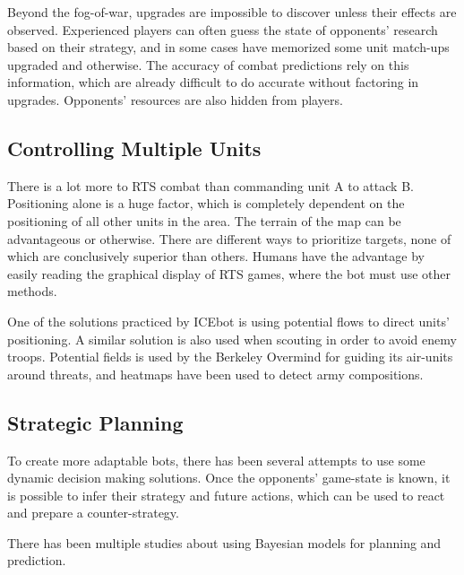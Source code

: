 	Beyond the fog-of-war, upgrades are impossible to discover unless their effects are observed. Experienced players can often guess the state of opponents' research based on their strategy, and in some cases have memorized some unit match-ups upgraded and otherwise. The accuracy of combat predictions rely on this information, which are already difficult to do accurate without factoring in upgrades. Opponents' resources are also hidden from players.
	
	
	
	\subsection*{Controlling Multiple Units}
	There is a lot more to RTS combat than commanding unit A to attack B. Positioning alone is a huge factor, which is completely dependent on the positioning of all other units in the area. The terrain of the map can be advantageous or otherwise. There are different ways to prioritize targets, none of which are conclusively superior than others. Humans have the advantage by easily reading the graphical display of RTS games, where the bot must use other methods.
	
	One of the solutions practiced by ICEbot is using potential flows to direct units' positioning. A similar solution is also used when scouting in order to avoid enemy troops. Potential fields is used by the Berkeley Overmind for guiding its air-units around threats, and heatmaps have been used to detect army compositions.
	

	\subsection*{Strategic Planning}
	To create more adaptable bots, there has been several attempts to use some dynamic decision making solutions. Once the opponents' game-state is known, it is possible to infer their strategy and future actions, which can be used to react and prepare a counter-strategy.
	
	There has been multiple studies about using Bayesian models for planning and prediction.
	
	
